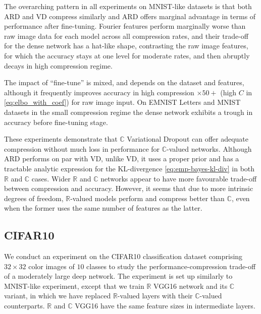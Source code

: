 \documentclass[a4paper,10pt,twocolumn]{article}
\newcommand{\real}{\mathbb{R}}
\newcommand{\cplx}{\mathbb{C}}
\begin{document}
The overarching pattern in all experiments on MNIST-like datasets is that both ARD and VD
compress similarly and ARD offers marginal advantage in terms of performance after fine-tuning.
Fourier features perform marginally worse than raw image data for each model across all
compression rates, and their trade-off for the dense network has a hat-like shape, contrasting
the raw image features, for which the accuracy stays at one level for moderate rates,
and then abruptly decays in high compression regime.

The impact of ``fine-tune'' is mixed, and depends on the dataset and features, although it
frequently improves accuracy in high compression $\times50+$ (high $C$ in \eqref{eq:elbo_with_coef})
for raw image input. On EMNIST Letters and MNIST datasets in the small compression regime the
dense network exhibits a trough in accuracy before fine-tuning stage.

These experiments demonstrate that $\cplx$ Variational Dropout can offer adequate compression
without much loss in performance for $\cplx$-valued networks. Although ARD performs on par
with VD, unlike VD, it uses a proper prior and has a tractable analytic expression for the
KL-divergence \eqref{eq:emp-bayes-kl-div} in both $\real$ and $\cplx$ cases.
Wider $\real$ and $\cplx$ networks appear to have more favourable trade-off between
compression and accuracy.
However, it seems that due to more intrinsic degrees of freedom, $\real$-valued models
perform and compress better than $\cplx$, even when the former uses the same number of
features as the latter.



\subsection{CIFAR10} %
\label{sub:cifar10}

We conduct an experiment on the CIFAR10 classification dataset \citep{krizhevsky_learning_2009}
comprising $32\times 32$ color images of $10$ classes to study the performance-compression
trade-off of a moderately large deep network.
The experiment is set up similarly to MNIST-like experiment, except that we train $\real$
VGG16 network \citep{simonyan_very_2015} and its $\cplx$ variant, in which we have replaced
$\real$-valued layers with their $\cplx$-valued counterparts. $\real$ and $\cplx$ VGG16 have
the same feature sizes in intermediate layers.
\end{document}
